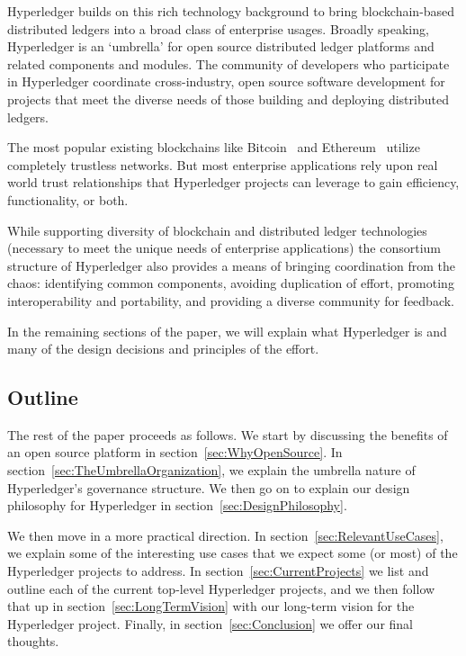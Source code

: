 Hyperledger builds on this rich technology background to bring blockchain-based distributed ledgers into a broad class of enterprise usages.  Broadly speaking, Hyperledger is an `umbrella' for open source distributed ledger platforms and related components and modules. The community of developers who participate in Hyperledger coordinate cross-industry, open source software development for projects that meet the diverse needs of those building and deploying distributed ledgers. 

The most popular existing blockchains like Bitcoin~\cite{Nak08} and Ethereum~\cite{But13} utilize completely trustless networks.  But most enterprise applications rely upon real world trust relationships that Hyperledger projects can leverage to gain efficiency, functionality, or both.

While supporting diversity of blockchain and distributed ledger technologies (necessary to meet the unique needs of enterprise applications) the consortium structure of Hyperledger also provides a means of bringing coordination from the chaos: identifying common components, avoiding duplication of effort, promoting interoperability and portability, and providing a diverse community for feedback.

In the remaining sections of the paper, we will explain what Hyperledger is and many of the design decisions and principles of the effort.

\subsection{Outline}
The rest of the paper proceeds as follows.  We start by discussing the benefits of an open source platform in section~\ref{sec:WhyOpenSource}.  In section~\ref{sec:TheUmbrellaOrganization}, we explain the umbrella nature of Hyperledger's governance structure.  We then go on to explain our design philosophy for Hyperledger in section~\ref{sec:DesignPhilosophy}.

We then move in a more practical direction.  In section~\ref{sec:RelevantUseCases}, we explain some of the interesting use cases that we expect some (or most) of the Hyperledger projects to address.  In section~\ref{sec:CurrentProjects} we list and outline each of the current top-level Hyperledger projects, and we then follow that up in section~\ref{sec:LongTermVision} with our long-term vision for the Hyperledger project.  Finally, in section~\ref{sec:Conclusion} we offer our final thoughts.
